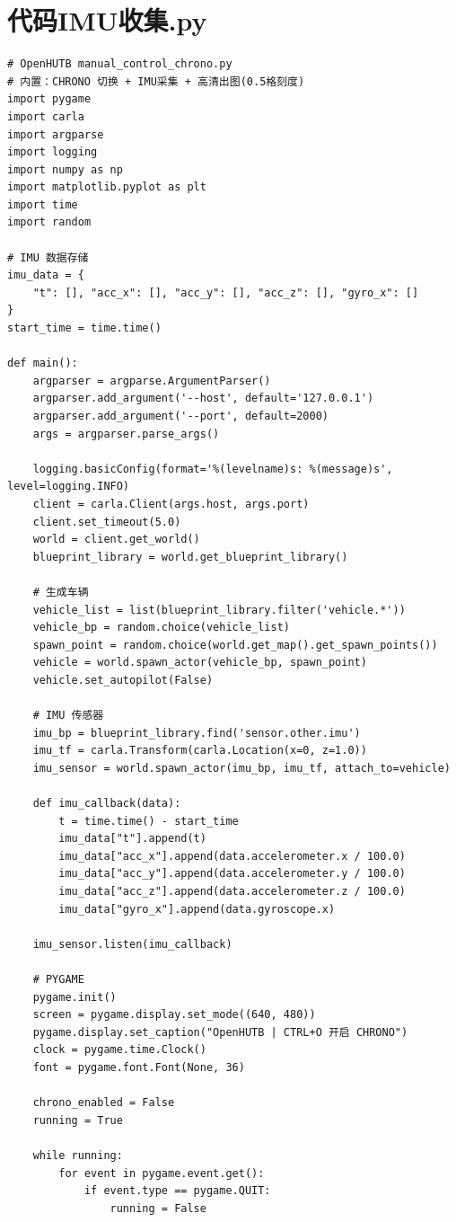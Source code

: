 
\section{代码IMU收集.py}
\begin{lstlisting}
# OpenHUTB manual_control_chrono.py
# 内置：CHRONO 切换 + IMU采集 + 高清出图(0.5格刻度)
import pygame
import carla
import argparse
import logging
import numpy as np
import matplotlib.pyplot as plt
import time
import random

# IMU 数据存储
imu_data = {
    "t": [], "acc_x": [], "acc_y": [], "acc_z": [], "gyro_x": []
}
start_time = time.time()

def main():
    argparser = argparse.ArgumentParser()
    argparser.add_argument('--host', default='127.0.0.1')
    argparser.add_argument('--port', default=2000)
    args = argparser.parse_args()

    logging.basicConfig(format='%(levelname)s: %(message)s', level=logging.INFO)
    client = carla.Client(args.host, args.port)
    client.set_timeout(5.0)
    world = client.get_world()
    blueprint_library = world.get_blueprint_library()

    # 生成车辆
    vehicle_list = list(blueprint_library.filter('vehicle.*'))
    vehicle_bp = random.choice(vehicle_list)
    spawn_point = random.choice(world.get_map().get_spawn_points())
    vehicle = world.spawn_actor(vehicle_bp, spawn_point)
    vehicle.set_autopilot(False)

    # IMU 传感器
    imu_bp = blueprint_library.find('sensor.other.imu')
    imu_tf = carla.Transform(carla.Location(x=0, z=1.0))
    imu_sensor = world.spawn_actor(imu_bp, imu_tf, attach_to=vehicle)

    def imu_callback(data):
        t = time.time() - start_time
        imu_data["t"].append(t)
        imu_data["acc_x"].append(data.accelerometer.x / 100.0)
        imu_data["acc_y"].append(data.accelerometer.y / 100.0)
        imu_data["acc_z"].append(data.accelerometer.z / 100.0)
        imu_data["gyro_x"].append(data.gyroscope.x)

    imu_sensor.listen(imu_callback)

    # PYGAME
    pygame.init()
    screen = pygame.display.set_mode((640, 480))
    pygame.display.set_caption("OpenHUTB | CTRL+O 开启 CHRONO")
    clock = pygame.time.Clock()
    font = pygame.font.Font(None, 36)

    chrono_enabled = False
    running = True

    while running:
        for event in pygame.event.get():
            if event.type == pygame.QUIT:
                running = False


\end{lstlisting}
